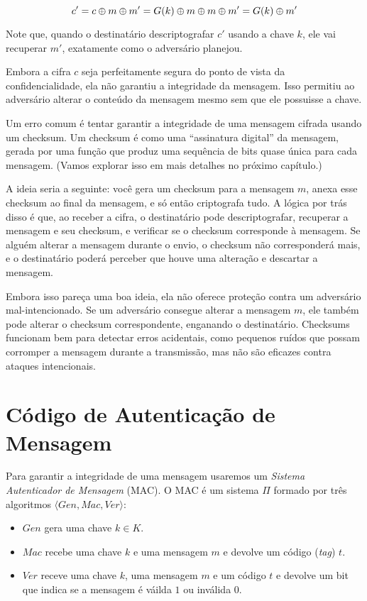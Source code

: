 \begin{displaymath}
c' = c \oplus m \oplus m' = G(k) \oplus m \oplus m \oplus m' = G(k) \oplus m'
\end{displaymath}

Note que, quando o destinatário descriptografar $c'$ usando a chave $k$, ele vai recuperar $m'$, exatamente como o adversário planejou.

Embora a cifra $c$ seja perfeitamente segura do ponto de vista da confidencialidade, ela não garantiu a integridade da mensagem.
Isso permitiu ao adversário alterar o conteúdo da mensagem mesmo sem que ele possuisse a chave.

Um erro comum é tentar garantir a integridade de uma mensagem cifrada usando um checksum. Um checksum é como uma ``assinatura digital'' da mensagem, gerada por uma função que produz uma sequência de bits quase única para cada mensagem.
(Vamos explorar isso em mais detalhes no próximo capítulo.)

A ideia seria a seguinte: você gera um checksum para a mensagem $m$, anexa esse checksum ao final da mensagem, e só então criptografa tudo.
A lógica por trás disso é que, ao receber a cifra, o destinatário pode descriptografar, recuperar a mensagem e seu checksum, e verificar se o checksum corresponde à mensagem.
Se alguém alterar a mensagem durante o envio, o checksum não corresponderá mais, e o destinatário poderá perceber que houve uma alteração e descartar a mensagem.

Embora isso pareça uma boa ideia, ela não oferece proteção contra um adversário mal-intencionado.
Se um adversário consegue alterar a mensagem $m$, ele também pode alterar o checksum correspondente, enganando o destinatário.
Checksums funcionam bem para detectar erros acidentais, como pequenos ruídos que possam corromper a mensagem durante a transmissão, mas não são eficazes contra ataques intencionais.

\section{Código de Autenticação de Mensagem}
\label{sec:mac}

Para garantir a integridade de uma mensagem usaremos um {\em Sistema Autenticador de Mensagem} (MAC).
O MAC é um sistema $\Pi$ formado por três algoritmos $\langle Gen, Mac, Ver \rangle$:
\begin{itemize}
\item $Gen$ gera uma chave $k \in K$.
\item $Mac$ recebe uma chave $k$ e uma mensagem $m$ e devolve um código ({\em tag}) $t$.
\item $Ver$ receve uma chave $k$, uma mensagem $m$ e um código $t$ e devolve um bit que indica se a mensagem é váilda $1$ ou inválida $0$.
\end{itemize}

